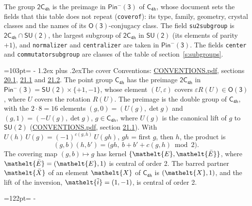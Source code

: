 \documentclass[10pt,a4paper]{article}
\makeatletter
\renewcommand\section{\@startsection{section}{1}{\z@}{-3ex plus -1ex minus -.2ex}%
  {1.2ex plus .2ex}{\normalfont\large\sffamily\bfseries\color{parttitle}}}
\newcommand{\needspace}[1]{\par\penalty-100\begingroup\dimen0=#1\relax\dimen2=\pagegoal
  \advance\dimen2-\pagetotal\ifdim\dimen0>\dimen2\relax\ifdim\dimen2>0pt\vfil\break\fi\fi
  \endgroup}
\numberwithin{equation}{section}
\newcommand{\eltfont}[1]{{\let\sigma\eltsigma\mathelt{#1}}}
\newcommand{\grp}[1]{\mathsf{#1}}
\newcommand{\elt}[1]{\eltfont{#1}}
\newcommand{\dirprod}{\times}
\newcommand{\barred}[1]{\bar{#1}}
\newcommand{\lift}[1]{\tilde{#1}}
\makeatother
\begin{document}
\leavevmode\label{n:element.inversion}\label{n:group.preimage}The group $\grp{2C_{4h}}$ is the preimage in $\grp{Pin^{-}(3)}$ of \href{../../../rotation/data/pdf/C4h.pdf}{$\grp{C_{4h}}$}, whose document sets the fields that this table does not repeat (\texttt{coverof}): its type, family, geometry, crystal classes and the names of its \href{../../../rotation/data/pdf/O3.pdf}{$\grp{O(3)}$}-conjugacy class. The field \texttt{su2subgroup} is $\grp{2C_{4h}} \cap \grp{SU(2)}$, the largest subgroup of $\grp{2C_{4h}}$ in $\grp{SU(2)}$ (its elements of parity $+1$), and \texttt{normalizer} and \texttt{centralizer} are taken in $\grp{Pin^{-}(3)}$. The fields \texttt{center} and \texttt{commutatorsubgroup} are classes of the table of section~\ref{s:subgroups}.
\needspace{103pt}
\section{The cover}\label{s:cover}
Conventions: \href{../../CONVENTIONS.pdf}{CONVENTIONS.pdf}, sections \href{../../CONVENTIONS.pdf\#conv.20.1}{20.1}, \href{../../CONVENTIONS.pdf\#conv.21.1}{21.1} and \href{../../CONVENTIONS.pdf\#conv.21.2}{21.2}.
\leavevmode\label{n:group.pin.minus}\label{n:group.su2}\label{n:local.pin.sign}\label{n:matrix.covered}\label{n:matrix.lift.su2}\label{n:index.bar}The point group $\grp{C_{4h}}$ has the preimage $\grp{2C_{4h}}$ in $\grp{Pin^{-}(3)} = \grp{SU(2)} \dirprod \{+1, -1\}$, whose element $(U, \varepsilon)$ covers $\varepsilon R(U) \in \grp{O(3)}$, where $U$ covers the rotation $R(U)$. The preimage is the double group of $\grp{C_{4h}}$, with the $2 \cdot 8 = 16$ elements $(g, 0) = (U(g), \det g)$ and $(g, 1) = (-U(g), \det g)$, $g \in \grp{C_{4h}}$, where $U(g)$ is the canonical lift of $g$ to $\grp{SU(2)}$ (\href{../../CONVENTIONS.pdf}{CONVENTIONS.pdf}, section \href{../../CONVENTIONS.pdf\#conv.21.1}{21.1}). \label{n:function.cocycle}With $U(h)\,U(g) = (-1)^{c(g,h)}\,U(gh)$, $gh$ = first $g$, then $h$, the product is
\begin{equation}\label{e:product}(g, b)(h, b') = \bigl(gh,\ b + b' + c(g, h) \bmod 2\bigr).\end{equation}
\leavevmode\label{n:mark.bar}The covering map $(g, b) \mapsto g$ has kernel $\{\elt{E}, \elt{\barred{E}}\}$, where $\elt{\barred{E}} = (\elt{E}, 1)$ is central of order 2. \label{n:element.named}\label{n:mark.lift}The barred partner $\elt{\barred{X}}$ of an element $\elt{X}$ of $\grp{C_{4h}}$ is $(\elt{X}, 1)$, and the lift of the inversion, $\elt{\lift{i}} = (1, -1)$, is central of order 2.
\needspace{122pt}
\end{document}
